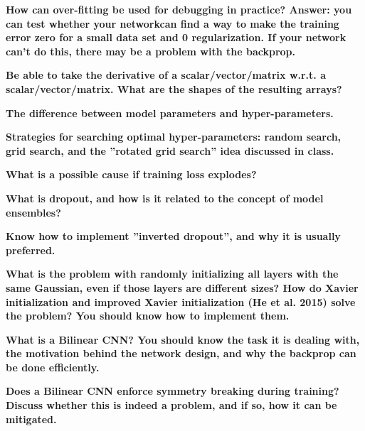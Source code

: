 \documentclass[10pt,letterpaper]{article}
\begin{document}
\begin{solution}
\end{solution}
\subitem \textbf{ How can over-fitting be used for debugging in practice? Answer: you can test whether your networkcan find a way to make the training error zero for a small data set and 0 regularization. If your network can’t do this, there may be a problem with the backprop. }
\begin{solution}
\end{solution}
\subitem \textbf{ Be able to take the derivative of a scalar/vector/matrix w.r.t. a scalar/vector/matrix. What are the shapes of the resulting arrays? }
\begin{solution}
\end{solution}
\subitem \textbf{ The difference between model parameters and hyper-parameters.}
\begin{solution}
\end{solution}
\subitem \textbf{ Strategies for searching optimal hyper-parameters: random search, grid search, and the ”rotated grid search” idea discussed in class.}
\begin{solution}
\end{solution}
\subitem \textbf{ What is a possible cause if training loss explodes?}
\begin{solution}
\end{solution}
\subitem \textbf{ What is dropout, and how is it related to the concept of model ensembles?}
\begin{solution}
\end{solution}
\subitem \textbf{ Know how to implement ”inverted dropout”, and why it is usually preferred.}
\begin{solution}
\end{solution}
\subitem \textbf{ What is the problem with randomly initializing all layers with the same Gaussian, even if those layers are different sizes? How do Xavier initialization and improved Xavier initialization (He et al. 2015) solve the problem? You should know how to implement them.}
\begin{solution}
\end{solution}
\subitem \textbf{ What is a Bilinear CNN? You should know the task it is dealing with, the motivation behind the network design, and why the backprop can be done efficiently.}
\begin{solution}
\end{solution}
\subitem \textbf{ Does a Bilinear CNN enforce symmetry breaking during training? Discuss whether this is indeed a problem, and if so, how it can be mitigated.}
\begin{solution}
\end{solution}
\end{document}
